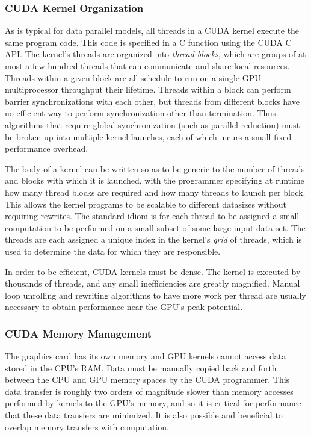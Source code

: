 \documentclass[preprint]{sigplanconf}
\begin{document}
\subsubsection{CUDA Kernel Organization}

As is typical for data parallel models, all threads in a CUDA kernel execute
the same program code.  This code is specified in a C function using the CUDA C
API. The kernel's threads are organized into {\it thread blocks}, which are
groups of at most a few hundred threads that can communicate and share local
resources. Threads within a given block are all schedule to run on a single GPU
multiprocessor throughput their lifetime.  Threads within a block can
perform barrier synchronizations with each other, but threads from different
blocks have no efficient way to perform synchronization other than termination.
Thus algorithms that require global synchronization (such as parallel reduction)
must be broken up into multiple kernel launches, each of which incurs a small
fixed performance overhead.

The body of a kernel can be written so as to be generic to the number of
threads and blocks with which it is launched, with the programmer specifying at
runtime how many thread blocks are required and how many threads to launch per
block. This allows the kernel programs to be scalable to different datasizes
without requiring rewrites. The standard idiom is for each thread to
be assigned a small computation to be performed on a small subset of some large
input data set.  The threads are each assigned a unique index in the kernel's
{\it grid} of threads, which is used to determine the data for which they are
responsible.

In order to be efficient, CUDA kernels must be dense.  The kernel is executed
by thousands of threads, and any small inefficiencies are greatly magnified.
Manual loop unrolling and rewriting algorithms to have more work per thread are
usually necessary to obtain performance near the GPU's peak potential.

\subsubsection{CUDA Memory Management}

The graphics card has its own memory and GPU kernels cannot access data stored
in the CPU's RAM.  Data must be manually copied back and forth between the CPU
and GPU memory spaces by the CUDA programmer.  This data transfer is roughly
two orders of magnitude slower than memory accesses performed by kernels to the
GPU's memory, and so it is critical for performance that these data transfers
are minimized.  It is also possible and beneficial to overlap memory transfers
with computation.
\end{document}
